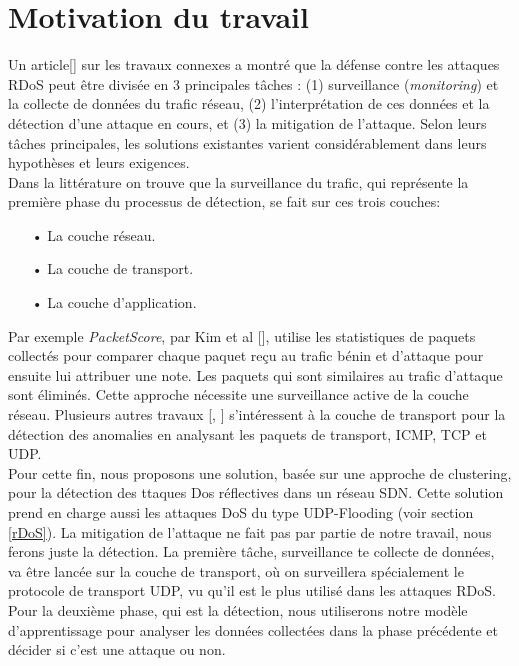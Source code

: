 \section{Motivation du travail}
Un article[\cite{24}] sur les travaux connexes a montré que la défense contre les attaques RDoS peut être divisée en 3 principales tâches : (1) surveillance (\textit{monitoring}) et la collecte de données du trafic réseau, (2) l’interprétation de ces données et la détection d’une attaque en cours, et (3) la mitigation de l’attaque. Selon leurs tâches principales, les solutions existantes varient considérablement dans leurs hypothèses et leurs exigences.\\
Dans la littérature on trouve que la surveillance du trafic, qui représente la première phase du processus de détection, se fait sur ces trois couches:\\
\begin{itemize}
\item[•] La couche réseau.
\item[•] La couche de transport.
\item[•] La couche d'application.\\
\end{itemize}
\newpage
Par exemple \textit{PacketScore}, par Kim et al [\cite{25}], utilise les statistiques de paquets collectés pour comparer chaque paquet reçu au trafic bénin et d’attaque pour ensuite lui attribuer une note. Les paquets qui sont similaires au trafic d’attaque sont éliminés. Cette approche nécessite une surveillance active de la couche réseau. Plusieurs autres travaux [\cite{26}, \cite{27}] s'intéressent à la couche de transport pour la détection des anomalies en analysant les paquets de transport, ICMP, TCP et UDP.\\

Pour cette fin, nous proposons une solution, basée sur une approche de clustering, pour la détection des ttaques Dos réflectives dans un réseau SDN. Cette solution prend en charge aussi les attaques DoS du type UDP-Flooding (voir section \ref{rDoS}). La mitigation de l'attaque ne fait pas par partie de notre travail, nous ferons juste la détection. La première tâche, surveillance te collecte de données, va être lancée sur la couche de transport, où on surveillera spécialement le protocole de transport UDP, vu qu'il est le plus utilisé dans les attaques RDoS. Pour la deuxième phase, qui est la détection, nous utiliserons notre modèle d'apprentissage pour analyser les données collectées dans la phase précédente et décider si c'est une attaque ou non.

